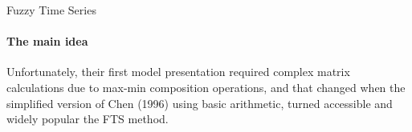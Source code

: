\documentclass[13pt]{beamer}
\begin{document}
	\begin{frame}{Fuzzy Time Series}
		\framesubtitle{The main idea}
		
		Unfortunately, their first model presentation required complex matrix calculations due to max-min composition operations, and that changed when the simplified version of Chen (1996) using basic arithmetic, turned accessible and widely popular the FTS method.
		
		\begin{table}[]
			\centering
			\renewcommand{\arraystretch}{1.2}
		\end{table}
		
	\end{frame}
	
\end{document}
